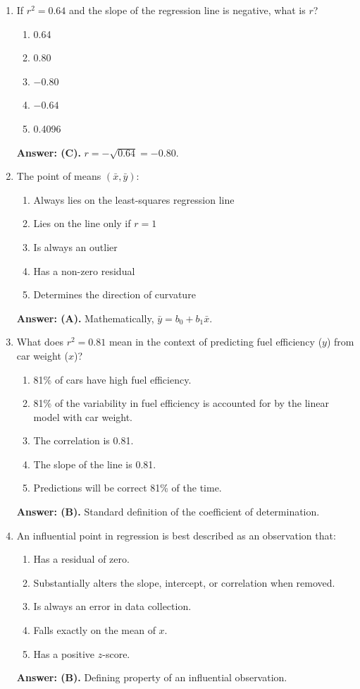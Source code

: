 \begin{enumerate}[leftmargin=1.5em]
  \item If $r^2 = 0.64$ and the slope of the regression line is negative, what is $r$?
  \begin{enumerate}[label=(\Alph*)]
    \item 0.64 \item 0.80 \item $-0.80$ \item $-0.64$ \item 0.4096
  \end{enumerate}
  \textbf{Answer: (C).} $r = -\sqrt{0.64} = -0.80$.

  \item The point of means $(\bar{x}, \bar{y})$:
  \begin{enumerate}[label=(\Alph*)]
    \item Always lies on the least-squares regression line \item Lies on the line only if $r = 1$ \item Is always an outlier \item Has a non-zero residual \item Determines the direction of curvature
  \end{enumerate}
  \textbf{Answer: (A).} Mathematically, $\bar{y} = b_0 + b_1\bar{x}$.

  \item What does $r^2 = 0.81$ mean in the context of predicting fuel efficiency ($y$) from car weight ($x$)?
  \begin{enumerate}[label=(\Alph*)]
    \item 81\% of cars have high fuel efficiency.
    \item 81\% of the variability in fuel efficiency is accounted for by the linear model with car weight.
    \item The correlation is 0.81.
    \item The slope of the line is 0.81.
    \item Predictions will be correct 81\% of the time.
  \end{enumerate}
  \textbf{Answer: (B).} Standard definition of the coefficient of determination.

  \item An influential point in regression is best described as an observation that:
  \begin{enumerate}[label=(\Alph*)]
    \item Has a residual of zero.
    \item Substantially alters the slope, intercept, or correlation when removed.
    \item Is always an error in data collection.
    \item Falls exactly on the mean of $x$.
    \item Has a positive $z$-score.
  \end{enumerate}
  \textbf{Answer: (B).} Defining property of an influential observation.


\end{enumerate}
